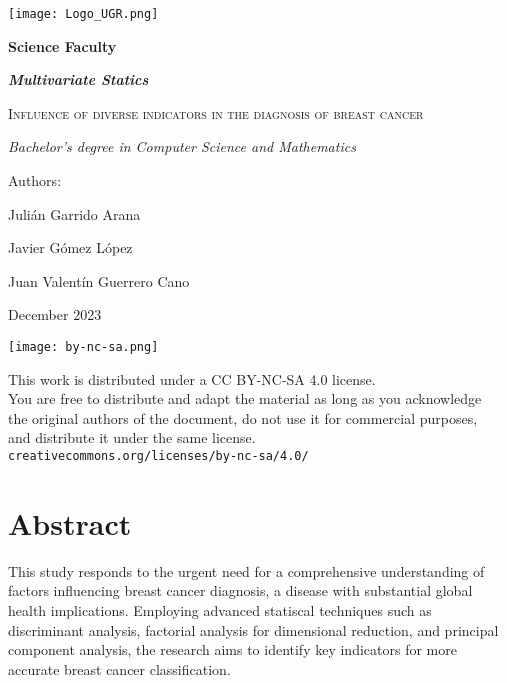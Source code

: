 \documentclass[10pt,a4paper]{article}
\theoremstyle{definition}
\theoremstyle{definition}
\begin{document}
	
\begin{titlepage}
	\centering
	{\texttt{[image: Logo\_UGR.png]}\par}
	\vspace{1cm}
	{\bfseries\Large Science Faculty \par}
	\vspace{0.5cm}
	{\bfseries\itshape\large Multivariate Statics \par}
	\vspace{2.5cm}
	{\scshape\Huge Influence of diverse indicators in the diagnosis of breast cancer\par}
	\vspace{3cm}
	{\itshape\Large Bachelor's degree in Computer Science and Mathematics}
	\vfill
	{\Large Authors: \par}
	{\Large Julián Garrido Arana \par}
	{\Large Javier Gómez López \par}
	{\Large Juan Valentín Guerrero Cano \par}
	
	\vfill
	{\Large December 2023 \par}
\end{titlepage}

\thispagestyle{empty}
\null
\vfill

\parbox[t]{\textwidth}{
  \texttt{[image: by-nc-sa.png]}\\[4pt]
  \raggedright %
  \sffamily\large
  {\Large This work is distributed under a CC BY-NC-SA 4.0 license.}\\[4pt]
  You are free to distribute and adapt the material as long as you acknowledge\\
  the original authors of the document, do not use it for commercial purposes,\\
  and distribute it under the same license.\\[4pt]
  \texttt{creativecommons.org/licenses/by-nc-sa/4.0/}
}

\newpage

\tableofcontents

\newpage

\section{Abstract}
This study responds to the urgent need for a comprehensive understanding of factors influencing breast cancer diagnosis, a disease with substantial global health implications. Employing advanced statiscal techniques such as discriminant analysis, factorial analysis for dimensional reduction, and principal component analysis, the research aims to identify key indicators for more accurate breast cancer classification. \\
\end{document}
